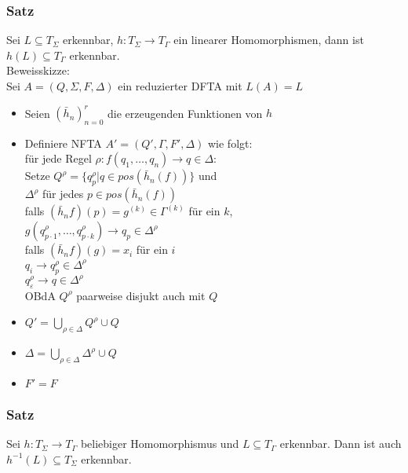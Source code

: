 \documentclass[titlepage]{article}
\begin{document}
\subsubsection{Satz}

Sei $L \subseteq T_\Sigma$ erkennbar, $h: T_\Sigma \to T_\Gamma$ ein linearer Homomorphismen,
dann ist $h(L) \subseteq T_\Gamma$ erkennbar.\\

Beweisskizze:\\
Sei $A = (Q, \Sigma, F, \Delta)$ ein reduzierter DFTA mit $L(A) = L$

\begin{itemize}
    \item Seien $(\bar{h}_n)_{n=0}^r$ die erzeugenden Funktionen von $h$
    \item Definiere NFTA $A' = (Q', \Gamma, F', \Delta)$ wie folgt:\\
        f\"ur jede Regel $\rho: f(q_1, \dots , q_n) \to q \in \Delta:$\\
            Setze $Q^\rho = \{ q_p^\rho | q \in pos(\bar{h}_n(f))\}$ und\\
            $\Delta ^\rho$ f\"ur jedes $p \in pos(\bar{h}_n(f))$\\
            falls $(\bar{h}_n f)(p) = g^{(k)} \in \Gamma^{(k)}$ f\"ur ein $k$,\\
            $g(q_{p \cdot 1}^\rho, \dots, q_{p \cdot k}^\rho) \to q_p \in \Delta^\rho$\\
            falls $(\bar{h}_n f)(g) = x_i$ f\"ur ein $i$\\
            $q_i \to q_p^\rho \in \Delta^\rho$\\
            $q_\varepsilon^\rho \to q \in \Delta^\rho$\\
            OBdA $Q^\rho$ paarweise disjukt auch mit $Q$\\
    \item $Q' = \bigcup\limits_{\rho \in \Delta} Q^\rho \cup Q$
    \item $\Delta = \bigcup\limits_{\rho \in \Delta} \Delta^\rho \cup Q$
    \item $F' = F$ 
\end{itemize}

\subsubsection{Satz}

Sei $h: T_\Sigma \to T_\Gamma$ beliebiger Homomorphismus und $L \subseteq T_\Gamma$ erkennbar.
Dann ist auch $h^{-1}(L) \subseteq T_\Sigma$ erkennbar.\\
\end{document}
